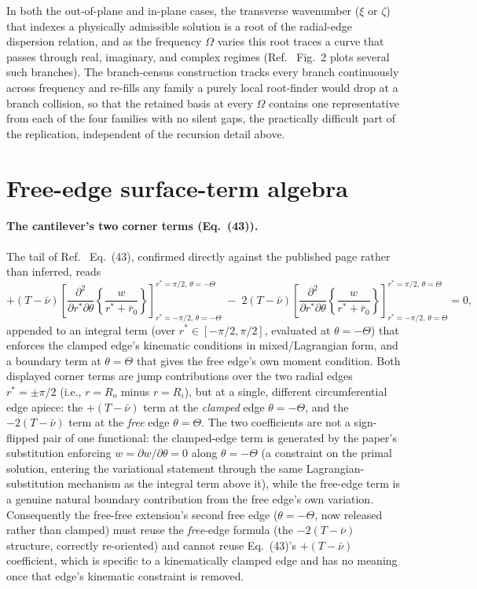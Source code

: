 \documentclass[11pt]{article}
\begin{document}
In both the out-of-plane and in-plane cases, the transverse wavenumber
($\xi$ or $\zeta$) that indexes a physically admissible solution is a root
of the radial-edge dispersion relation, and as the frequency $\Omega$
varies this root traces a curve that passes through real, imaginary, and
complex regimes (Ref.~\cite{seok1} Fig.~2 plots several such branches).
The branch-census construction tracks every branch continuously across
frequency and re-fills any family a purely local root-finder would drop
at a branch collision, so that the retained basis at every $\Omega$
contains one representative from each of the four families with no
silent gaps, the practically difficult part of the replication,
independent of the recursion detail above.

\section{Free-edge surface-term algebra}\label{sec:surface-algebra}
\label{sec:corner-appendix}
\paragraph{The cantilever's two corner terms (Eq.~(43)).} The tail of
Ref.~\cite{seok1} Eq.~(43), confirmed directly against the published
page rather than inferred, reads
\begin{equation}
+(T-\bar\nu)\left[\frac{\partial^2}{\partial r^{*}\partial\theta}
\left\{\frac{w}{r^{*}+\bar r_0}\right\}\right]_{r^{*}=-\pi/2,\,\theta=-\Theta}^{r^{*}=\pi/2,\,\theta=-\Theta}
\;-\;2(T-\bar\nu)\left[\frac{\partial^2}{\partial r^{*}\partial\theta}
\left\{\frac{w}{r^{*}+\bar r_0}\right\}\right]_{r^{*}=-\pi/2,\,\theta=\Theta}^{r^{*}=\pi/2,\,\theta=\Theta}
=0, \tag{B.1}
\end{equation}
appended to an integral term (over $r^{*}\in[-\pi/2,\pi/2]$, evaluated at
$\theta=-\Theta$) that enforces the clamped edge's kinematic conditions in
mixed/Lagrangian form, and a boundary term at $\theta=\Theta$ that gives
the free edge's own moment condition. Both displayed corner terms are jump
contributions over the two radial edges $r^{*}=\pm\pi/2$ (i.e., $r=R_o$
minus $r=R_i$), but at a single, different circumferential edge apiece: the
$+(T-\bar\nu)$ term at the \emph{clamped} edge $\theta=-\Theta$, and the
$-2(T-\bar\nu)$ term at the \emph{free} edge $\theta=\Theta$. The two
coefficients are not a sign-flipped pair of one functional: the clamped-edge
term is generated by the paper's substitution enforcing $w=\partial
w/\partial\theta=0$ along $\theta=-\Theta$ (a constraint on the primal
solution, entering the variational statement through the same
Lagrangian-substitution mechanism as the integral term above it), while the
free-edge term is a genuine natural boundary contribution from the free
edge's own variation. Consequently the free-free extension's second free
edge ($\theta=-\Theta$, now released rather than clamped) must reuse the
\emph{free}-edge formula (the $-2(T-\bar\nu)$ structure, correctly
re-oriented) and cannot reuse Eq.~(43)'s $+(T-\bar\nu)$ coefficient,
which is specific to a kinematically clamped edge and has no meaning once
that edge's kinematic constraint is removed.
\end{document}
